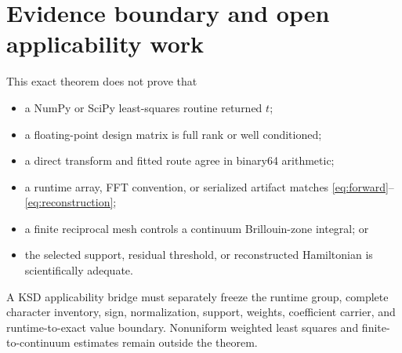 \documentclass[11pt]{article}
\begin{document}
\section{Evidence boundary and open applicability work}
This exact theorem does not prove that
\begin{itemize}
  \item a NumPy or SciPy least-squares routine returned $t$;
  \item a floating-point design matrix is full rank or well conditioned;
  \item a direct transform and fitted route agree in binary64 arithmetic;
  \item a runtime array, FFT convention, or serialized artifact matches
        \eqref{eq:forward}--\eqref{eq:reconstruction};
  \item a finite reciprocal mesh controls a continuum Brillouin-zone integral; or
  \item the selected support, residual threshold, or reconstructed Hamiltonian is scientifically
        adequate.
\end{itemize}
A KSD applicability bridge must separately freeze the runtime group, complete character inventory,
sign, normalization, support, weights, coefficient carrier, and runtime-to-exact value boundary.
Nonuniform weighted least squares and finite-to-continuum estimates remain outside the theorem.

\printbibliography[title={References}]
\end{document}
